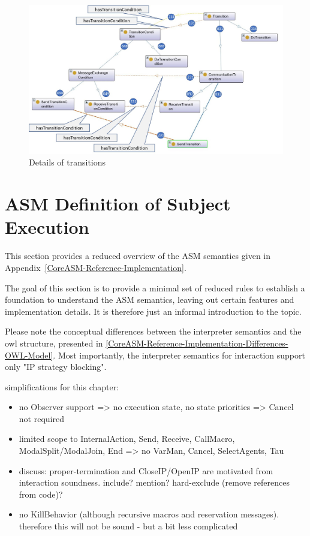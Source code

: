 \begin{figure}[htbp]
	\centering
	\includegraphics[width=1.0\linewidth]{Figures/Ontology/SubjectExecution/20190105-Transitions}
	\caption[Details of transitions]{Details of transitions}
	\label{fig:20190105-transitions}
\end{figure}

\section{ASM Definition of Subject Execution}




This section provides a reduced overview of the ASM semantics given in Appendix~\ref{CoreASM-Reference-Implementation}.

The goal of this section is to provide a minimal set of reduced rules to establish a foundation to understand the ASM semantics,
leaving out certain features and implementation details.
It is therefore just an informal introduction to the topic.

Please note the conceptual differences between the interpreter semantics and the owl structure, presented in \ref{CoreASM-Reference-Implementation-Differences-OWL-Model}.
Most importantly, the interpreter semantics for interaction support only "IP strategy blocking".

simplifications for this chapter:
\begin{itemize}
	\item no Observer support => no execution state, no state priorities => Cancel not required
	\item limited scope to InternalAction, Send, Receive, CallMacro, ModalSplit/ModalJoin, End => no VarMan, Cancel, SelectAgents, Tau
	\item discuss: proper-termination and CloseIP/OpenIP are motivated from interaction soundness. include? mention? hard-exclude (remove references from code)?
	\item no KillBehavior (although recursive macros and reservation messages). therefore this will not be sound - but a bit less complicated
\end{itemize}

